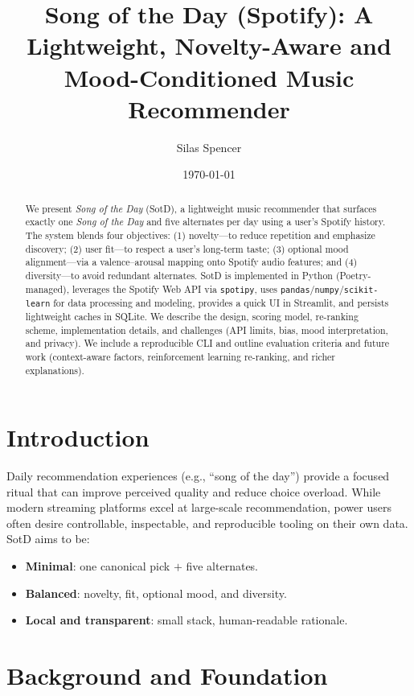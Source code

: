 \documentclass[11pt]{article}
\title{Song of the Day (Spotify): A Lightweight, Novelty-Aware and Mood-Conditioned Music Recommender}
\author{Silas Spencer}
\date{\today}
\begin{document}
\maketitle

\begin{abstract}
We present \emph{Song of the Day} (SotD), a lightweight music recommender that surfaces exactly one \emph{Song of the Day} and five alternates per day using a user's Spotify history. The system blends four objectives: (1) novelty---to reduce repetition and emphasize discovery; (2) user fit---to respect a user's long-term taste; (3) optional mood alignment---via a valence--arousal mapping onto Spotify audio features; and (4) diversity---to avoid redundant alternates. SotD is implemented in Python (Poetry-managed), leverages the Spotify Web API via \texttt{spotipy}, uses \texttt{pandas}/\texttt{numpy}/\texttt{scikit-learn} for data processing and modeling, provides a quick UI in Streamlit, and persists lightweight caches in SQLite. We describe the design, scoring model, re-ranking scheme, implementation details, and challenges (API limits, bias, mood interpretation, and privacy). We include a reproducible CLI and outline evaluation criteria and future work (context-aware factors, reinforcement learning re-ranking, and richer explanations).
\end{abstract}

\section{Introduction}
Daily recommendation experiences (e.g., ``song of the day'') provide a focused ritual that can improve perceived quality and reduce choice overload. While modern streaming platforms excel at large-scale recommendation, power users often desire controllable, inspectable, and reproducible tooling on their own data. SotD aims to be:
\begin{itemize}[leftmargin=*]
  \item \textbf{Minimal}: one canonical pick $+$ five alternates.
  \item \textbf{Balanced}: novelty, fit, optional mood, and diversity.
  \item \textbf{Local and transparent}: small stack, human-readable rationale.
\end{itemize}

\section{Background and Foundation}
\end{document}
